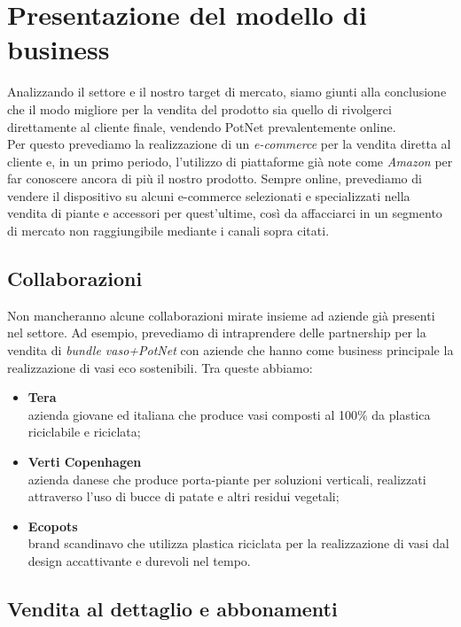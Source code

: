 \newpage
\section{Presentazione del modello di business}

Analizzando il settore e il nostro target di mercato, siamo giunti alla conclusione che il modo migliore per la vendita del prodotto sia quello di rivolgerci direttamente al cliente finale, vendendo PotNet prevalentemente online.\\Per questo prevediamo la realizzazione di un \textit{e-commerce} per la vendita diretta al cliente e, in un primo periodo, l'utilizzo di piattaforme già note come \textit{Amazon} per far conoscere ancora di più il nostro prodotto. Sempre online, prevediamo di vendere il dispositivo su alcuni e-commerce selezionati e specializzati nella vendita di piante e accessori per quest'ultime, così da affacciarci in un segmento di mercato non raggiungibile mediante i canali sopra citati.

\subsection{Collaborazioni}

Non mancheranno alcune collaborazioni mirate insieme ad aziende già presenti nel settore. Ad esempio, prevediamo di intraprendere delle partnership per la vendita di \textit{bundle vaso+PotNet} con aziende che hanno come business principale la realizzazione di vasi eco sostenibili. Tra queste abbiamo:
\begin{itemize}
	\item \textbf{Tera}\\
	azienda giovane ed italiana che produce vasi composti al 100\% da plastica riciclabile e riciclata;
	\item \textbf{Verti Copenhagen}\\
	azienda danese che produce porta-piante per soluzioni verticali, realizzati attraverso l'uso di bucce di patate e altri residui vegetali;
	\item \textbf{Ecopots}\\
	brand scandinavo che utilizza plastica riciclata per la realizzazione di vasi dal design accattivante e durevoli nel tempo.
\end{itemize}


\subsection{Vendita al dettaglio e abbonamenti}

